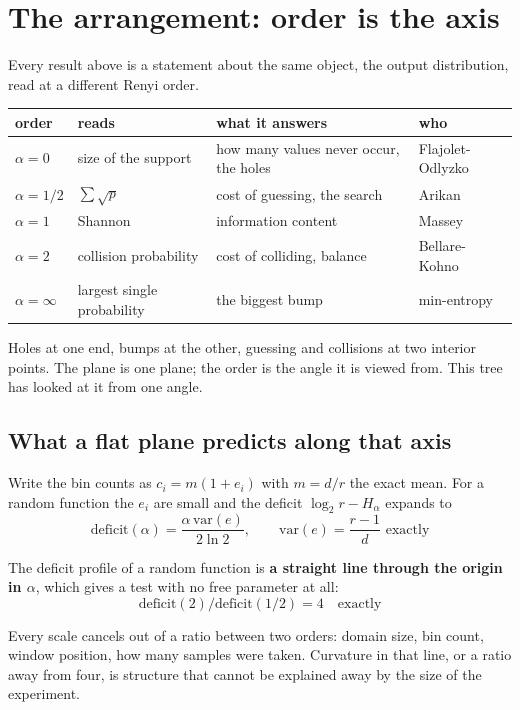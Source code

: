 \section{The arrangement: order is the axis}

Every result above is a statement about the same object, the output distribution, read at a different Renyi order.

\begin{center}
\begin{tabular}{@{}llll@{}}
\toprule
order & reads & what it answers & who \\
\midrule
\(\alpha = 0\) & size of the support & how many values never occur, the holes & Flajolet-Odlyzko \\
\(\alpha = 1/2\) & \(\sum\sqrt{p}\) & cost of guessing, the search & Arikan \\
\(\alpha = 1\) & Shannon & information content & Massey \\
\(\alpha = 2\) & collision probability & cost of colliding, balance & Bellare-Kohno \\
\(\alpha = \infty\) & largest single probability & the biggest bump & min-entropy \\
\bottomrule
\end{tabular}
\end{center}

Holes at one end, bumps at the other, guessing and collisions at two interior points. The plane is one plane; the order is the angle it is viewed from. This tree has looked at it from one angle.

\subsection{What a flat plane predicts along that axis}

Write the bin counts as \(c_i = m(1 + e_i)\) with \(m = d/r\) the exact mean. For a random function the \(e_i\) are small and the deficit \(\log_2 r - H_\alpha\) expands to
\[
\mathrm{deficit}(\alpha) = \frac{\alpha\,\mathrm{var}(e)}{2\ln 2}, \qquad \mathrm{var}(e) = \frac{r-1}{d} \text{ exactly}
\]

The deficit profile of a random function is \textbf{a straight line through the origin in \(\alpha\)}, which gives a test with no free parameter at all:
\[
\mathrm{deficit}(2) / \mathrm{deficit}(1/2) = 4 \quad\text{exactly}
\]

Every scale cancels out of a ratio between two orders: domain size, bin count, window position, how many samples were taken. Curvature in that line, or a ratio away from four, is structure that cannot be explained away by the size of the experiment.

